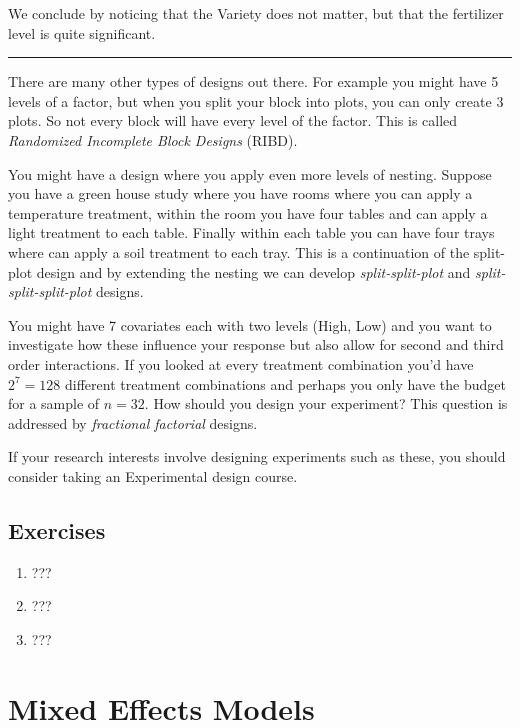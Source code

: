 \documentclass[]{book}
\providecommand{\tightlist}{%
  \setlength{\itemsep}{0pt}\setlength{\parskip}{0pt}}
\theoremstyle{definition}
\theoremstyle{definition}
\theoremstyle{remark}
\begin{document}
We conclude by noticing that the Variety does not matter, but that the
fertilizer level is quite significant.

\begin{center}\rule{0.5\linewidth}{\linethickness}\end{center}

There are many other types of designs out there. For example you might
have 5 levels of a factor, but when you split your block into plots, you
can only create 3 plots. So not every block will have every level of the
factor. This is called \emph{Randomized Incomplete Block Designs}
(RIBD).

You might have a design where you apply even more levels of nesting.
Suppose you have a green house study where you have rooms where you can
apply a temperature treatment, within the room you have four tables and
can apply a light treatment to each table. Finally within each table you
can have four trays where can apply a soil treatment to each tray. This
is a continuation of the split-plot design and by extending the nesting
we can develop \emph{split-split-plot} and \emph{split-split-split-plot}
designs.

You might have 7 covariates each with two levels (High, Low) and you
want to investigate how these influence your response but also allow for
second and third order interactions. If you looked at every treatment
combination you'd have \(2^7=128\) different treatment combinations and
perhaps you only have the budget for a sample of \(n=32\). How should
you design your experiment? This question is addressed by
\emph{fractional factorial} designs.

If your research interests involve designing experiments such as these,
you should consider taking an Experimental design course.

\section{Exercises}\label{exercises-9}

\begin{enumerate}
\def\labelenumi{\arabic{enumi}.}
\tightlist
\item
  ???
\item
  ???
\item
  ???
\end{enumerate}

\chapter{Mixed Effects Models}\label{mixed-effects-models}
\end{document}
